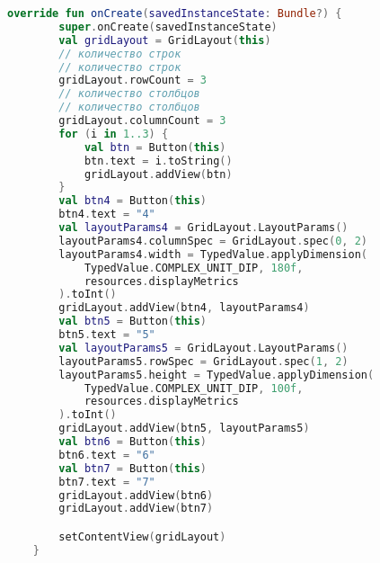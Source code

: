 \begin{lstlisting}[language=Kotlin, caption=\leftline{Kotlin}, label=lst:ScrollViewK]
override fun onCreate(savedInstanceState: Bundle?) {
        super.onCreate(savedInstanceState)
        val gridLayout = GridLayout(this)
        // количество строк
        // количество строк
        gridLayout.rowCount = 3
        // количество столбцов
        // количество столбцов
        gridLayout.columnCount = 3
        for (i in 1..3) {
            val btn = Button(this)
            btn.text = i.toString()
            gridLayout.addView(btn)
        }
        val btn4 = Button(this)
        btn4.text = "4"
        val layoutParams4 = GridLayout.LayoutParams()
        layoutParams4.columnSpec = GridLayout.spec(0, 2)
        layoutParams4.width = TypedValue.applyDimension(
            TypedValue.COMPLEX_UNIT_DIP, 180f,
            resources.displayMetrics
        ).toInt()
        gridLayout.addView(btn4, layoutParams4)
        val btn5 = Button(this)
        btn5.text = "5"
        val layoutParams5 = GridLayout.LayoutParams()
        layoutParams5.rowSpec = GridLayout.spec(1, 2)
        layoutParams5.height = TypedValue.applyDimension(
            TypedValue.COMPLEX_UNIT_DIP, 100f,
            resources.displayMetrics
        ).toInt()
        gridLayout.addView(btn5, layoutParams5)
        val btn6 = Button(this)
        btn6.text = "6"
        val btn7 = Button(this)
        btn7.text = "7"
        gridLayout.addView(btn6)
        gridLayout.addView(btn7)

        setContentView(gridLayout)
    }
\end{lstlisting}
